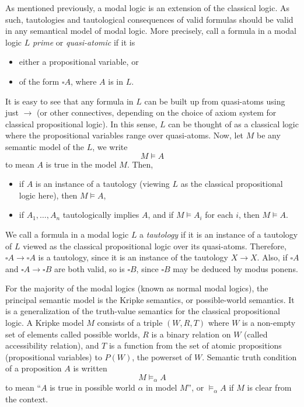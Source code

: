 \documentclass[12pt]{article}
\begin{document}
As mentioned previously, a modal logic is an extension of the classical logic.  As such, tautologies and tautological consequences of valid formulas should be valid in any semantical model of modal logic.  More precisely, call a formula in a modal logic $L$ \emph{prime} or \emph{quasi-atomic} if it is
\begin{multicols}{2}{ 
\begin{itemize}
\item either a propositional variable, or 
\item of the form $\square A$, where $A$ is in $L$.  
\end{itemize}}
\end{multicols}
It is easy to see that any formula in $L$ can be built up from quasi-atoms using just $\to$ (or other connectives, depending on the choice of axiom system for classical propositional logic).  In this sense, $L$ can be thought of as a classical logic where the propositional variables range over quasi-atoms.  Now, let $M$ be any semantic model of the $L$, we write $$M \models A$$ to mean $A$ is true in the model $M$.  Then,
\begin{itemize}
\item if $A$ is an instance of a tautology (viewing $L$ as the classical propositional logic here), then $M \models A$,
\item if $A_1, \ldots, A_n$ tautologically implies $A$, and if $M \models A_i$ for each $i$, then $M \models A$.
\end{itemize}
We call a formula in a modal logic $L$ a \emph{tautology} if it is an instance of a tautology of $L$ viewed as the classical propositional logic over its quasi-atoms.  Therefore, $\square A\to \square A$ is a tautology, since it is an instance of the tautology $X\to X$.  Also, if $\square A$ and $\square A\to \square B$ are both valid, so is $\square B$, since $\square B$ may be deduced by modus ponens.

For the majority of the modal logics (known as normal modal logics), the principal semantic model is the Kripke semantics, or possible-world semantics.  It is a generalization of the truth-value semantics for the classical propositional logic.  A Kripke model $M$ consists of a triple $(W,R,T)$ where $W$ is a non-empty set of elements called possible worlds, $R$ is a binary relation on $W$ (called accessibility relation), and $T$ is a function from the set of atomic propositions (propositional variables) to $P(W)$, the powerset of $W$.  Semantic truth condition of a proposition $A$ is written $$M \models_{\alpha} A$$ to mean ``$A$ is true in possible world $\alpha$ in model $M$'', or $\models_{\alpha} A$ if $M$ is clear from the context.
\end{document}
